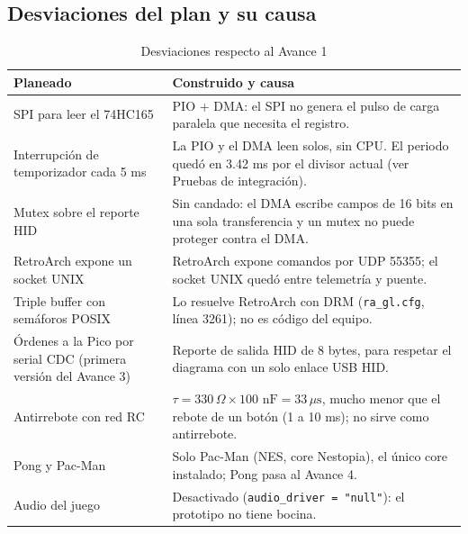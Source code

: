 \subsection{Desviaciones del plan y su causa}
\begin{table}[H]
	\centering
	\caption{Desviaciones respecto al Avance 1}
	\label{tab:desviaciones}
	\small
	\begin{tabular}{|p{2.3cm}|p{5.2cm}|}
		\hline
		\textbf{Planeado} & \textbf{Construido y causa} \\
		\hline
		SPI para leer el 74HC165 & PIO + DMA: el SPI no genera el pulso de carga paralela que necesita el registro. \\
		\hline
		Interrupción de temporizador cada 5 ms & La PIO y el DMA leen solos, sin CPU. El periodo quedó en 3.42 ms por el divisor actual (ver Pruebas de integración). \\
		\hline
		Mutex sobre el reporte HID & Sin candado: el DMA escribe campos de 16 bits en una sola transferencia y un mutex no puede proteger contra el DMA. \\
		\hline
		RetroArch expone un socket UNIX & RetroArch expone comandos por UDP 55355; el socket UNIX quedó entre telemetría y puente. \\
		\hline
		Triple buffer con semáforos POSIX & Lo resuelve RetroArch con DRM (\texttt{ra\_gl.cfg}, línea 3261); no es código del equipo. \\
		\hline
		Órdenes a la Pico por serial CDC (primera versión del Avance 3) & Reporte de salida HID de 8 bytes, para respetar el diagrama con un solo enlace USB HID. \\
		\hline
		Antirrebote con red RC & $\tau = 330\,\Omega \times 100\text{ nF} = 33\,\mu\text{s}$, mucho menor que el rebote de un botón (1 a 10 ms); no sirve como antirrebote. \\
		\hline
		Pong y Pac-Man & Solo Pac-Man (NES, core Nestopia), el único core instalado; Pong pasa al Avance 4. \\
		\hline
		Audio del juego & Desactivado (\texttt{audio\_driver = "null"}): el prototipo no tiene bocina. \\
		\hline
	\end{tabular}
\end{table}


